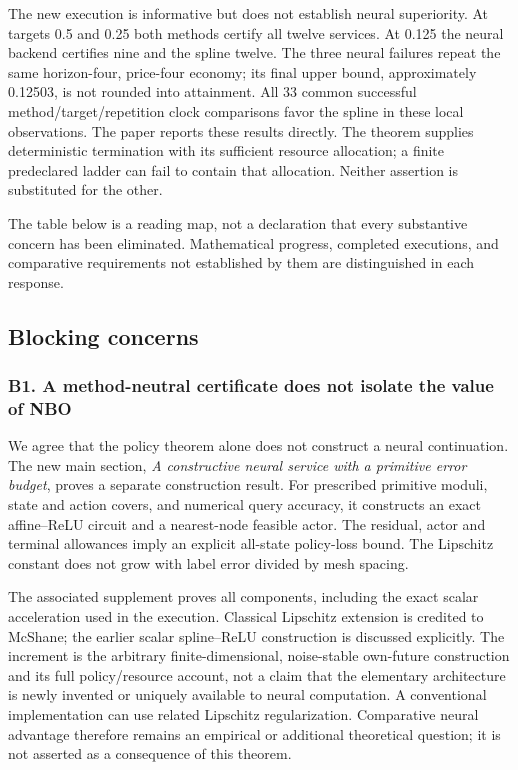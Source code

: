 \documentclass[ecta,nameyear,draft]{econsocart}
\begin{document}
The new execution is informative but does not establish neural
superiority. At targets 0.5 and 0.25 both methods certify all twelve
services. At 0.125 the neural backend certifies nine and the spline
twelve. The three neural failures repeat the same horizon-four,
price-four economy; its final upper bound, approximately 0.12503, is not
rounded into attainment. All 33 common successful
method/target/repetition clock comparisons favor the spline in these
local observations. The paper reports these results directly. The
theorem supplies deterministic termination with its sufficient resource
allocation; a finite predeclared ladder can fail to contain that
allocation. Neither assertion is substituted for the other.

The table below is a reading map, not a declaration that every
substantive concern has been eliminated. Mathematical progress,
completed executions, and comparative requirements not established by
them are distinguished in each response.

\hypertarget{blocking-concerns}{%
\subsection{Blocking concerns}\label{blocking-concerns}}

\hypertarget{b1-a-method-neutral-certificate-does-not-isolate-the-value-of-nbo}{%
\subsubsection{B1. A method-neutral certificate does not isolate the
value of
NBO}\label{b1-a-method-neutral-certificate-does-not-isolate-the-value-of-nbo}}

We agree that the policy theorem alone does not construct a neural
continuation. The new main section, \emph{A constructive neural service
with a primitive error budget}, proves a separate construction result.
For prescribed primitive moduli, state and action covers, and numerical
query accuracy, it constructs an exact affine--ReLU circuit and a
nearest-node feasible actor. The residual, actor and terminal allowances
imply an explicit all-state policy-loss bound. The Lipschitz constant
does not grow with label error divided by mesh spacing.

The associated supplement proves all components, including the exact
scalar acceleration used in the execution. Classical Lipschitz extension
is credited to McShane; the earlier scalar spline--ReLU construction is
discussed explicitly. The increment is the arbitrary finite-dimensional,
noise-stable own-future construction and its full policy/resource
account, not a claim that the elementary architecture is newly invented
or uniquely available to neural computation. A conventional
implementation can use related Lipschitz regularization. Comparative
neural advantage therefore remains an empirical or additional
theoretical question; it is not asserted as a consequence of this
theorem.
\end{document}
